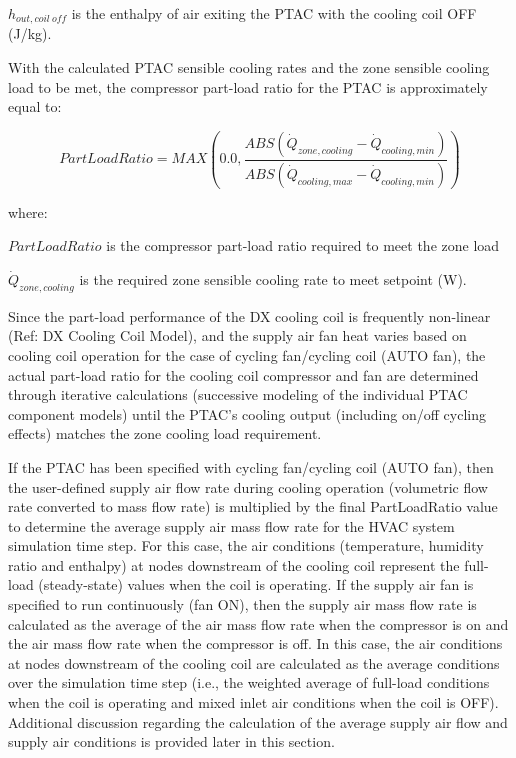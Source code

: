 \(h_{out,coil~off}\) is the enthalpy of air exiting the PTAC with the cooling coil OFF (J/kg).

With the calculated PTAC sensible cooling rates and the zone sensible cooling load to be met, the compressor part-load ratio for the PTAC is approximately equal to:

\begin{equation}
  PartLoadRatio = MAX \left( 0.0, \frac{ABS \left( \dot{Q}_{zone,cooling} - \dot{Q}_{cooling,min} \right)}{ABS \left( \dot{Q}_{cooling,max} - \dot{Q}_{cooling,min} \right)} \right)
\end{equation}

where:

\(PartLoadRatio\) is the compressor part-load ratio required to meet the zone load

\(\dot{Q}_{zone,cooling}\) is the required zone sensible cooling rate to meet setpoint (W).

Since the part-load performance of the DX cooling coil is frequently non-linear (Ref: DX Cooling Coil Model), and the supply air fan heat varies based on cooling coil operation for the case of cycling fan/cycling coil (AUTO fan), the actual part-load ratio for the cooling coil compressor and fan are determined through iterative calculations (successive modeling of the individual PTAC component models) until the PTAC's cooling output (including on/off cycling effects) matches the zone cooling load requirement.

If the PTAC has been specified with cycling fan/cycling coil (AUTO fan), then the user-defined supply air flow rate during cooling operation (volumetric flow rate converted to mass flow rate) is multiplied by the final PartLoadRatio value to determine the average supply air mass flow rate for the HVAC system simulation time step. For this case, the air conditions (temperature, humidity ratio and enthalpy) at nodes downstream of the cooling coil represent the full-load (steady-state) values when the coil is operating. If the supply air fan is specified to run continuously (fan ON), then the supply air mass flow rate is calculated as the average of the air mass flow rate when the compressor is on and the air mass flow rate when the compressor is off. In this case, the air conditions at nodes downstream of the cooling coil are calculated as the average conditions over the simulation time step (i.e., the weighted average of full-load conditions when the coil is operating and mixed inlet air conditions when the coil is OFF). Additional discussion regarding the calculation of the average supply air flow and supply air conditions is provided later in this section.

